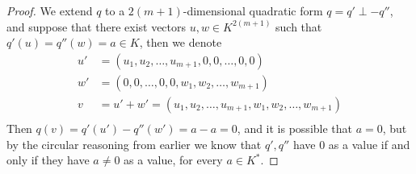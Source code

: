 \documentclass{article}
\begin{document}
\begin{proof}
We extend $q$ to a $2(m+1)$-dimensional quadratic form $q=q'\perp-q''$, and suppose that there exist vectors $u,w\in{K}^{2(m+1)}$ such that $q'(u)=q''(w)=a\in{K}$, then we denote 
\begin{align*}
u'&=(u_1,u_2,\dots,u_{m+1},0,0,\dots,0,0)\\
w'&=(0,0,\dots,0,0,w_1,w_2,\dots,w_{m+1})\\
v&=u'+w'=(u_1,u_2,\dots,u_{m+1},w_1,w_2,\dots,w_{m+1})\\
\end{align*}
Then $q(v)=q'(u')-q''(w')=a-a=0$, and it is possible that $a=0$, but by the circular reasoning from earlier we know that $q',q''$ have $0$ as a value if and only if they have $a\neq0$ as a value, for every $a\in{K}^{\ast}$.
\end{proof}
\end{document}
